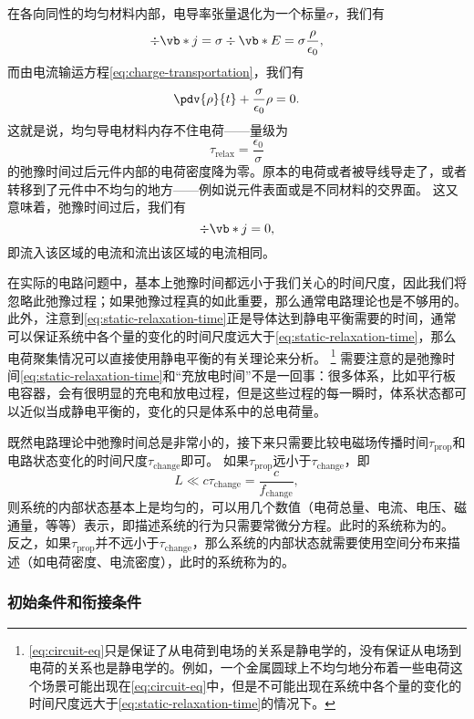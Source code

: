 在各向同性的均匀材料内部，电导率张量退化为一个标量$\sigma$，我们有
\[
    \div{\vb*{j}} = \sigma \div{\vb*{E}} = \sigma \frac{\rho}{\epsilon_0},
\]
而由电流输运方程\eqref{eq:charge-transportation}，我们有
\[
    \pdv{\rho}{t} + \frac{\sigma}{\epsilon_0} \rho = 0.
\]
这就是说，均匀导电材料内存不住电荷——量级为
\begin{equation}
    \tau_\text{relax} = \frac{\epsilon_0}{\sigma}
    \label{eq:static-relaxation-time}
\end{equation}
的弛豫时间过后元件内部的电荷密度降为零。原本的电荷或者被导线导走了，或者转移到了元件中不均匀的地方——例如说元件表面或是不同材料的交界面。
这又意味着，弛豫时间过后，我们有
\[
    \div{\vb*{j}} = 0,
\]
即流入该区域的电流和流出该区域的电流相同。

在实际的电路问题中，基本上弛豫时间都远小于我们关心的时间尺度，因此我们将忽略此弛豫过程；如果弛豫过程真的如此重要，那么通常电路理论也是不够用的。
此外，注意到\eqref{eq:static-relaxation-time}正是导体达到静电平衡需要的时间，通常可以保证系统中各个量的变化的时间尺度远大于\eqref{eq:static-relaxation-time}，那么电荷聚集情况可以直接使用静电平衡的有关理论来分析。%
\footnote{\eqref{eq:circuit-eq}只是保证了从电荷到电场的关系是静电学的，没有保证从电场到电荷的关系也是静电学的。例如，一个金属圆球上不均匀地分布着一些电荷这个场景可能出现在\eqref{eq:circuit-eq}中，但是不可能出现在系统中各个量的变化的时间尺度远大于\eqref{eq:static-relaxation-time}的情况下。}%
需要注意的是弛豫时间\eqref{eq:static-relaxation-time}和“充放电时间”不是一回事：很多体系，比如平行板电容器，会有很明显的充电和放电过程，但是这些过程的每一瞬时，体系状态都可以近似当成静电平衡的，变化的只是体系中的总电荷量。

既然电路理论中弛豫时间总是非常小的，接下来只需要比较电磁场传播时间$\tau_\text{prop}$和电路状态变化的时间尺度$\tau_\text{change}$即可。
如果$\tau_\text{prop}$远小于$\tau_\text{change}$，即
\begin{equation}
    L \ll c \tau_\text{change} = \frac{c}{f_\text{change}},
\end{equation}
则系统的内部状态基本上是均匀的，可以用几个数值（电荷总量、电流、电压、磁通量，等等）表示，即描述系统的行为只需要常微分方程。此时的系统称为的。
反之，如果$\tau_\text{prop}$并不远小于$\tau_\text{change}$，那么系统的内部状态就需要使用空间分布来描述（如电荷密度、电流密度），此时的系统称为的。

\subsubsection{初始条件和衔接条件}

